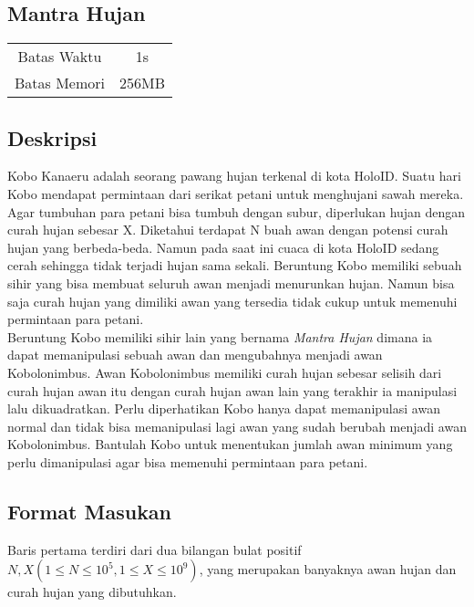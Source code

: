 \documentclass{article}
\begin{document}
\begin{center}

    
    \section*{Mantra Hujan} %

    \begin{tabular}{ | c c | }
        \hline
        Batas Waktu  & 1s \\    %
        Batas Memori & 256MB \\  %
        \hline
    \end{tabular}
\end{center}

\subsection*{Deskripsi}

Kobo Kanaeru adalah seorang pawang hujan terkenal di kota HoloID. Suatu hari Kobo mendapat permintaan dari serikat petani untuk menghujani sawah mereka. Agar tumbuhan para petani bisa tumbuh dengan subur, diperlukan hujan dengan curah hujan sebesar X. Diketahui terdapat N buah awan dengan potensi curah hujan yang berbeda-beda. Namun pada saat ini cuaca di kota HoloID sedang cerah sehingga tidak terjadi hujan sama sekali. Beruntung Kobo memiliki sebuah sihir yang bisa membuat seluruh awan menjadi menurunkan hujan. Namun bisa saja curah hujan yang dimiliki awan yang tersedia tidak cukup untuk memenuhi permintaan para petani.\\ 

Beruntung Kobo memiliki sihir lain yang bernama \emph{Mantra Hujan} dimana ia dapat memanipulasi sebuah awan dan mengubahnya menjadi awan Kobolonimbus. Awan Kobolonimbus memiliki curah hujan sebesar selisih dari curah hujan awan itu dengan curah hujan awan lain yang terakhir ia manipulasi lalu dikuadratkan. Perlu diperhatikan Kobo hanya dapat memanipulasi awan normal dan tidak bisa memanipulasi lagi awan yang sudah berubah menjadi awan Kobolonimbus. Bantulah Kobo untuk menentukan jumlah awan minimum yang perlu dimanipulasi agar bisa memenuhi permintaan para petani.

\subsection*{Format Masukan}

Baris pertama terdiri dari dua bilangan bulat positif $N, X (1 \leq N \leq 10^5, 1 \leq X \leq 10^9)$, yang merupakan banyaknya awan hujan dan curah hujan yang dibutuhkan.\\
\end{document}
